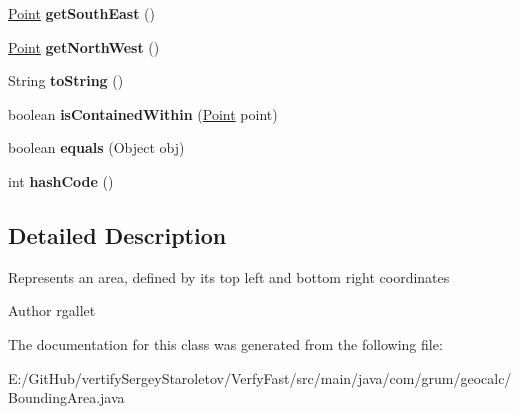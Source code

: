 \begin{DoxyCompactItemize}
\mbox{\hyperlink{classcom_1_1grum_1_1geocalc_1_1_point}{Point}} {\bfseries get\+South\+East} ()
\item 
\mbox{\label{classcom_1_1grum_1_1geocalc_1_1_bounding_area_afc32e8f79a029ee766da9e6ec30adca6}} 
\mbox{\hyperlink{classcom_1_1grum_1_1geocalc_1_1_point}{Point}} {\bfseries get\+North\+West} ()
\item 
\mbox{\label{classcom_1_1grum_1_1geocalc_1_1_bounding_area_a88bb42190ecc1dfe091edf7594eaca9e}} 
String {\bfseries to\+String} ()
\item 
\mbox{\label{classcom_1_1grum_1_1geocalc_1_1_bounding_area_af8906f95bae598e39e9eee055f4ff7c6}} 
boolean {\bfseries is\+Contained\+Within} (\mbox{\hyperlink{classcom_1_1grum_1_1geocalc_1_1_point}{Point}} point)
\item 
\mbox{\label{classcom_1_1grum_1_1geocalc_1_1_bounding_area_ad849c90d225275d97d229a77219a4993}} 
boolean {\bfseries equals} (Object obj)
\item 
\mbox{\label{classcom_1_1grum_1_1geocalc_1_1_bounding_area_ac13d85c4f74903467cbad74bc497a9af}} 
int {\bfseries hash\+Code} ()
\end{DoxyCompactItemize}


\subsection{Detailed Description}
Represents an area, defined by its top left and bottom right coordinates

\begin{DoxyAuthor}{Author}
rgallet 
\end{DoxyAuthor}


The documentation for this class was generated from the following file\+:\begin{DoxyCompactItemize}
\item 
E\+:/\+Git\+Hub/vertify\+Sergey\+Staroletov/\+Verfy\+Fast/src/main/java/com/grum/geocalc/Bounding\+Area.\+java\end{DoxyCompactItemize}
